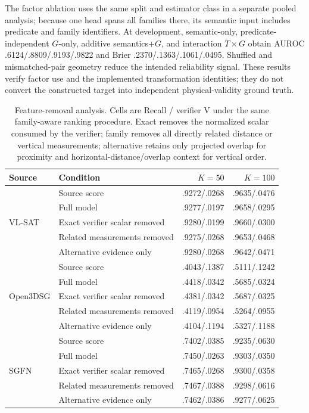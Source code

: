 The factor ablation uses the same split and estimator class in a separate
pooled analysis; because one head spans all families there, its semantic input
includes predicate and family identifiers. At development, semantic-only,
predicate-independent $G$-only, additive semantics+$G$, and interaction
$T\times G$ obtain AUROC .6124/.8809/.9193/.9822 and Brier
.2370/.1363/.1061/.0495. Shuffled and mismatched-pair geometry reduce the
intended reliability signal. These results verify factor use and the implemented
transformation identities; they do not convert the constructed target into independent
physical-validity ground truth.

\begin{table}[t]
\centering
{\small
\setlength{\tabcolsep}{2pt}
\begin{tabularx}{\linewidth}{@{}l>{\raggedright\arraybackslash}Xrr@{}}
\toprule
Source & Condition & $K=50$ & $K=100$ \\
\midrule
\multirow{5}{*}{VL-SAT}
 & Source score & .9272/.0268 & .9635/.0476 \\
 & Full model & .9277/.0197 & .9658/.0295 \\
 & Exact verifier scalar removed & .9280/.0199 & .9660/.0300 \\
 & Related measurements removed & .9275/.0268 & .9653/.0468 \\
 & Alternative evidence only & .9280/.0268 & .9642/.0471 \\
\midrule
\multirow{5}{*}{Open3DSG}
 & Source score & .4043/.1387 & .5111/.1242 \\
 & Full model & .4418/.0342 & .5685/.0324 \\
 & Exact verifier scalar removed & .4381/.0342 & .5687/.0325 \\
 & Related measurements removed & .4119/.0954 & .5264/.0955 \\
 & Alternative evidence only & .4104/.1194 & .5327/.1188 \\
\midrule
\multirow{5}{*}{SGFN}
 & Source score & .7402/.0385 & .9235/.0630 \\
 & Full model & .7450/.0263 & .9303/.0350 \\
 & Exact verifier scalar removed & .7465/.0268 & .9300/.0358 \\
 & Related measurements removed & .7467/.0388 & .9298/.0616 \\
 & Alternative evidence only & .7462/.0386 & .9277/.0625 \\
\bottomrule
\end{tabularx}
}
\caption{Feature-removal analysis. Cells are Recall / verifier V under the same
family-aware ranking procedure. Exact removes the normalized scalar consumed by
the verifier; family removes all directly related distance or vertical
measurements; alternative retains only projected overlap for proximity and
horizontal-distance/overlap context for vertical order.}
\label{tab:primitive-holdout}
\end{table}

